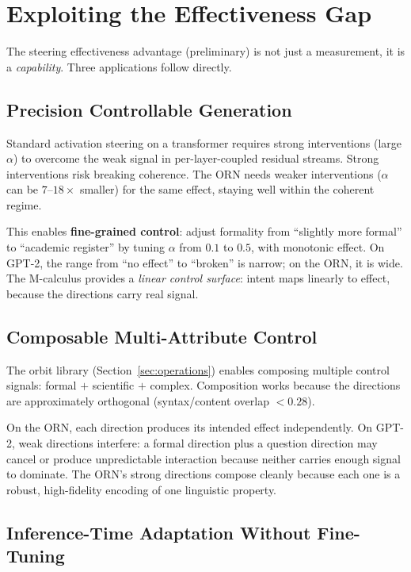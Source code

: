 \documentclass[11pt, a4paper]{article}
\theoremstyle{plain}
\theoremstyle{definition}
\theoremstyle{remark}
\begin{document}
\section{Exploiting the Effectiveness Gap}
\label{sec:exploit}

The steering effectiveness advantage (preliminary) is not just a measurement, it is a \emph{capability}.
Three applications follow directly.

\subsection{Precision Controllable Generation}

Standard activation steering on a transformer requires strong interventions (large $\alpha$) to overcome the weak signal in per-layer-coupled residual streams.
Strong interventions risk breaking coherence.
The ORN needs weaker interventions ($\alpha$ can be $7$--$18\times$ smaller) for the same effect, staying well within the coherent regime.

This enables \textbf{fine-grained control}: adjust formality from ``slightly more formal'' to ``academic register'' by tuning $\alpha$ from $0.1$ to $0.5$, with monotonic effect.
On GPT-2, the range from ``no effect'' to ``broken'' is narrow; on the ORN, it is wide.
The M-calculus provides a \emph{linear control surface}: intent maps linearly to effect, because the directions carry real signal.

\subsection{Composable Multi-Attribute Control}

The orbit library (Section~\ref{sec:operations}) enables composing multiple control signals: formal $+$ scientific $+$ complex.
Composition works because the directions are approximately orthogonal (syntax/content overlap $< 0.28$).

On the ORN, each direction produces its intended effect independently.
On GPT-2, weak directions interfere: a formal direction plus a question direction may cancel or produce unpredictable interaction because neither carries enough signal to dominate.
The ORN's strong directions compose cleanly because each one is a robust, high-fidelity encoding of one linguistic property.

\subsection{Inference-Time Adaptation Without Fine-Tuning}
\end{document}
